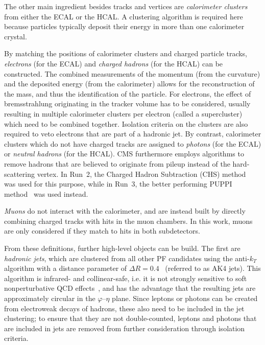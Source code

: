 The other main ingredient besides tracks and vertices are \textit{calorimeter clusters} from either the ECAL or the HCAL. A clustering algorithm is required here because particles typically deposit their energy in more than one calorimeter crystal.

By matching the positions of calorimeter clusters and charged particle tracks, \textit{electrons} (for the ECAL) and \textit{charged hadrons} (for the HCAL) can be constructed. The combined measurements of the momentum (from the curvature) and the deposited energy (from the calorimeter) allows for the reconstruction of the mass, and thus the identification of the particle.
For electrons, the effect of bremsstrahlung originating in the tracker volume has to be considered, usually resulting in multiple calorimeter clusters per electron (called a supercluster) which need to be combined together. Isolation criteria on the clusters are also required to veto electrons that are part of a hadronic jet. 
By contrast, calorimeter clusters which do not have charged tracks are assigned to \textit{photons} (for the ECAL) or \textit{neutral hadrons} (for the HCAL). 
CMS furthermore employs algorithms to remove hadrons that are believed to originate from pileup instead of the hard-scattering vertex. In Run~2, the Charged Hadron Subtraction (CHS) method~\cite{CMS:PRF-14-001} was used for this purpose, while in Run~3, the better performing PUPPI method~\cite{Bertolini:2014bba,CMS:2020ebo} was used instead.

\textit{Muons} do not interact with the calorimeter, and are instead built by directly combining charged tracks with hits in the muon chambers. In this work, muons are only considered if they match to hits in both subdetectors.

From these definitions, further high-level objects can be build. The first are \textit{hadronic jets}, which are clustered from all other PF candidates using the anti-$k_T$ algorithm with a distance parameter of $\Delta R = 0.4$~\cite{Cacciari:2008gp} (referred to as AK4 jets). This algorithm is infrared- and collinear-safe, i.e. it is not strongly sensitive to soft nonperturbative QCD effects~\cite{Skands:2012ts}, and has the advantage that the resulting jets are approximately circular in the $\varphi$--$\eta$ plane. Since leptons or photons can be created from electroweak decays of hadrons, these also need to be included in the jet clustering; to ensure that they are not double-counted, leptons and photons that are included in jets are removed from further consideration through isolation criteria.

